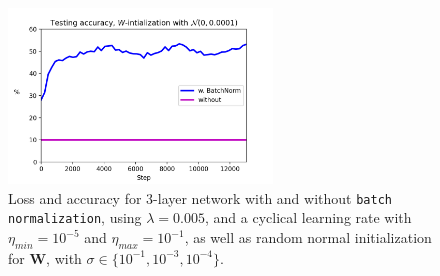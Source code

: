 \documentclass{article}
\begin{document}
\begin{figure}[h!]
		\includegraphics[width=7cm]{../plots/acc_comp_sigma3.png}
		\caption{Loss and accuracy for $3$-layer network with and without \texttt{batch normalization}, using $\lambda=0.005$, and a cyclical learning rate with $\eta_{min} = 10^{-5}$ and $\eta_{max} = 10^{-1}$, as well as random normal initialization for $\bm{W}$, with $\sigma\in\{10^{-1}, 10^{-3}, 10^{-4}\}$.}
	\end{figure}
\end{document}
